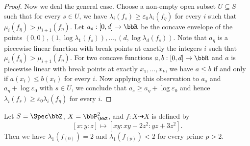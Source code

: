 \begin{proof}
    Now we deal the general case.
    Choose a non-empty open subset $U \subseteq S$ such that for every $s \in U$, we have $\lambda_i(f_s) \geq \varepsilon_0 \lambda_i(f_\eta)$ for every $i$ such that $\mu_i(f_\eta) > \mu_{i+1}(f_\eta)$.
    Let $a_s: [0,d] \to \bbR$ be the concave envelope of the points $(0,0), (1, \log \lambda_1(f_s)), \ldots, (d, \log \lambda_d(f_s))$.
    Note that $a_\eta$ is a piecewise linear function with break points at exactly the integers $i$ such that $\mu_i(f_\eta) > \mu_{i+1}(f_\eta)$.
    For two concave functions $a, b: [0,d] \to \bbR$ and $a$ is piecewise linear with break points at exactly $x_1, \ldots, x_k$, we have $a \leq b$ if and only if $a(x_i) \leq b(x_i)$ for every $i$.
    Now applying this observation to $a_s$ and $a_\eta + \log \varepsilon_0$ with $s \in U$, we conclude that $a_s \geq a_\eta + \log \varepsilon_0$ and hence $\lambda_i(f_s) \geq \varepsilon_0 \lambda_i(f_\eta)$ for every $i$.
  \end{proof}

  \begin{example}
    Let $S = \Spec \bbZ$, $X = \bbP^2_{\bbZ}$, and $f: X \dashrightarrow X$ is defined by
    \[ [x:y:z] \mapsto [xy:xy-2z^2:yz+3z^2]. \]
    Then we have $\lambda_1(f_{(0)}) = 2$ and $\lambda_1(f_{(p)}) < 2$ for every prime $p > 2$.
    
  \end{example}
